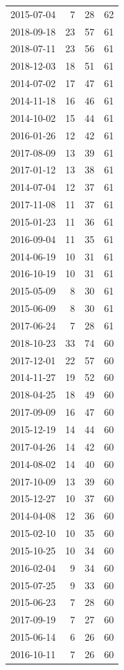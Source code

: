 \begin{tabular}{lrrr}
2015-07-04 & 7 & 28 & 62 \\
2018-09-18 & 23 & 57 & 61 \\
2018-07-11 & 23 & 56 & 61 \\
2018-12-03 & 18 & 51 & 61 \\
2014-07-02 & 17 & 47 & 61 \\
2014-11-18 & 16 & 46 & 61 \\
2014-10-02 & 15 & 44 & 61 \\
2016-01-26 & 12 & 42 & 61 \\
2017-08-09 & 13 & 39 & 61 \\
2017-01-12 & 13 & 38 & 61 \\
2014-07-04 & 12 & 37 & 61 \\
2017-11-08 & 11 & 37 & 61 \\
2015-01-23 & 11 & 36 & 61 \\
2016-09-04 & 11 & 35 & 61 \\
2014-06-19 & 10 & 31 & 61 \\
2016-10-19 & 10 & 31 & 61 \\
2015-05-09 & 8 & 30 & 61 \\
2015-06-09 & 8 & 30 & 61 \\
2017-06-24 & 7 & 28 & 61 \\
2018-10-23 & 33 & 74 & 60 \\
2017-12-01 & 22 & 57 & 60 \\
2014-11-27 & 19 & 52 & 60 \\
2018-04-25 & 18 & 49 & 60 \\
2017-09-09 & 16 & 47 & 60 \\
2015-12-19 & 14 & 44 & 60 \\
2017-04-26 & 14 & 42 & 60 \\
2014-08-02 & 14 & 40 & 60 \\
2017-10-09 & 13 & 39 & 60 \\
2015-12-27 & 10 & 37 & 60 \\
2014-04-08 & 12 & 36 & 60 \\
2015-02-10 & 10 & 35 & 60 \\
2015-10-25 & 10 & 34 & 60 \\
2016-02-04 & 9 & 34 & 60 \\
2015-07-25 & 9 & 33 & 60 \\
2015-06-23 & 7 & 28 & 60 \\
2017-09-19 & 7 & 27 & 60 \\
2015-06-14 & 6 & 26 & 60 \\
2016-10-11 & 7 & 26 & 60 \\

\end{tabular}
